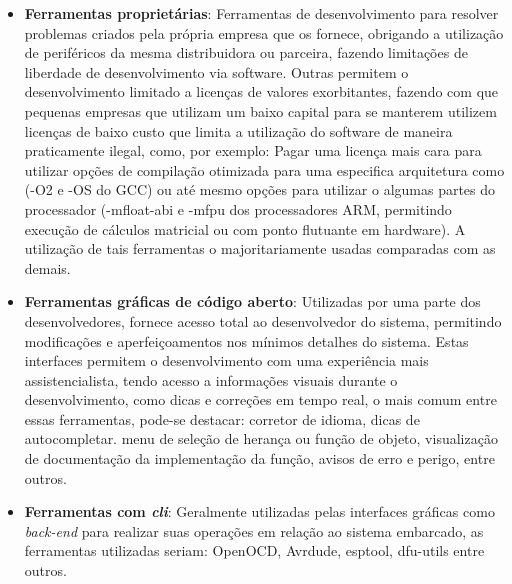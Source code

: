 \begin{itemize}
 \item \textbf{Ferramentas proprietárias}: Ferramentas de desenvolvimento para resolver problemas criados pela própria empresa que os fornece, obrigando a utilização de periféricos da mesma distribuidora ou parceira, fazendo limitações de liberdade de desenvolvimento via software. Outras permitem o desenvolvimento limitado a licenças de valores exorbitantes, fazendo com que pequenas empresas que utilizam um baixo capital para se manterem utilizem licenças de baixo custo que limita a utilização do software de maneira praticamente ilegal, como, por exemplo: Pagar uma licença mais cara para utilizar opções de compilação otimizada para uma especifica arquitetura como (-O2 e -OS do GCC) ou até mesmo opções para utilizar o algumas partes do processador (-mfloat-abi e -mfpu dos processadores ARM, permitindo execução de cálculos matricial ou com ponto flutuante em hardware). A utilização de tais ferramentas o majoritariamente usadas comparadas com as demais.
 \item \textbf{Ferramentas gráficas de código aberto}: Utilizadas por uma parte dos desenvolvedores, fornece acesso total ao desenvolvedor do sistema, permitindo modificações e aperfeiçoamentos nos mínimos detalhes do sistema. Estas interfaces permitem o desenvolvimento com uma experiência mais assistencialista, tendo acesso a informações visuais durante o desenvolvimento, como dicas e correções em tempo real, o mais comum entre essas ferramentas, pode-se destacar: corretor de idioma, dicas de autocompletar. menu de seleção de herança ou função de objeto, visualização de documentação da implementação da função, avisos de erro e perigo, entre outros.
 \item \textbf{Ferramentas com \textit{cli}}: Geralmente utilizadas pelas interfaces gráficas como \textit{back-end} para realizar suas
 operações em relação ao sistema embarcado, as ferramentas utilizadas seriam: OpenOCD, Avrdude, esptool, dfu-utils entre outros.
\end{itemize}




